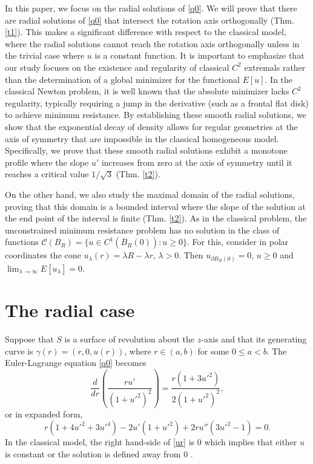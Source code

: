 \documentclass[preprint,11pt]{elsarticle}
\theoremstyle{definition}
\begin{document}
 In this paper, we focus on the radial solutions of \eqref{q0}. We will prove that there are radial solutions of \eqref{q0} that intersect the rotation axis orthogonally (Thm.  \ref{t1}). This makes a significant difference with respect to the classical model, where the radial solutions cannot reach the rotation axis orthogonally unless in the trivial case where $u$ is a constant function. It is important to emphasize that our study focuses on the existence and regularity of classical $C^2$ extremals rather than the determination of a global minimizer for the functional $E[u]$. In the classical Newton problem, it is well known that the absolute minimizer lacks $C^2$ regularity, typically requiring a jump in the derivative (such as a frontal flat disk) to achieve minimum resistance.  By establishing these smooth radial solutions, we show that the exponential decay of density allows for regular geometries at the axis of symmetry that are impossible in the classical homogeneous model. Specifically, we prove that these smooth radial solutions exhibit a monotone profile where the slope $u'$ increases from zero at the axis of symmetry until it reaches a critical value $1/\sqrt{3}$ (Thm. \ref{t2}).
 
 
 
  On the other hand, we also study the maximal domain of the radial solutions, proving that this domain is a bounded interval   where the slope of the solution at the end point of the interval is finite (Thm.  \ref{t2}).  As in the   classical problem, the unconstrained minimum resistance problem has no solution in the class of functions $\mathcal{C}(B_R)=\{u\in C^1( \overline{B}_R(0))\colon u\geq 0\}$. For this, consider in polar coordinates the cone $u_\lambda(r)=\lambda R-\lambda r$, $\lambda>0$. Then  $u_{\partial B_R(0)}=0$, $u\geq 0$ and   $ \lim_{\lambda\to \infty}E[u_\lambda]= 0$.  






\section{The radial case}\label{s2}

Suppose that $S$ is a surface of revolution about the $z$-axis and that its generating curve is $\gamma(r)=(r,0, u(r))$, where 
$r\in (a,b)$ for some $0\leq a<b$.  The Euler-Lagrange equation \eqref{q0} becomes
 \begin{equation}\label{ur}
 \frac{d}{dr}\left(\frac{r u'}{(1 + u'^2)^2}\right) = \frac{r (1+3u'^2)}{2(1 + u'^2)^2},
\end{equation}
or in expanded form, 
\begin{equation}\label{ur2}
r \left( 1 + 4 u'^2 + 3 u'^4 \right) - 2 u' \left( 1 + u'^2 \right) + 2 r u'' \left( 3 u'^2 - 1 \right) = 0.
\end{equation}
 In the classical model, the right hand-side of \eqref{ur} is $0$ which implies that either $u$ is constant or the solution   is defined away from $0$ \cite{go}.  
 
\end{document}
